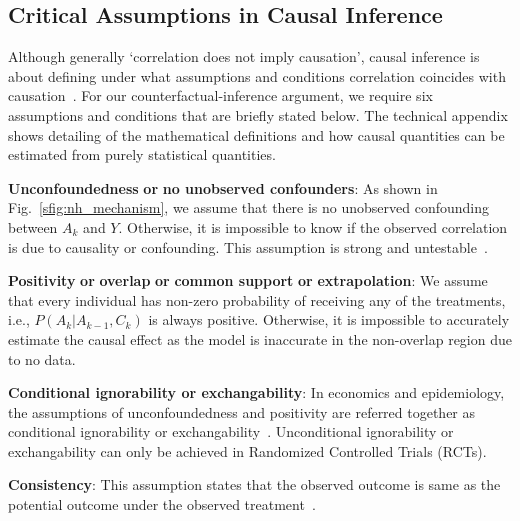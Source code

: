 \documentclass[letterpaper]{article} %
\begin{document}
\subsection{Critical Assumptions in Causal Inference}
Although generally `correlation does not imply causation', causal inference is about defining under what assumptions and conditions correlation coincides with causation~\cite{pearl2009causality, neal2020Intro2CI}. For our counterfactual-inference argument, we require six assumptions and conditions that are briefly stated below. 
The technical appendix shows detailing of the mathematical definitions and how causal quantities can be estimated from purely statistical quantities. 

\begin{inparaenum}[1.]
\item \textbf{Unconfoundedness} \textbf{or} \textbf{no unobserved confounders}: 
As shown in Fig.~\ref{sfig:nh_mechanism}, we assume that there is no unobserved confounding between $A_k$ and $Y$. Otherwise, it is impossible to know if the observed correlation is due to causality or confounding. This assumption is strong and untestable~\cite{Rubin1990unconfoundedness}. 

\item \textbf{Positivity} \textbf{or} \textbf{overlap} \textbf{or} \textbf{common support} \textbf{or} \textbf{extrapolation}: We assume that every individual has non-zero probability of receiving any of the treatments, i.e., $P(A_k|A_{k-1},C_k)$ is always positive. Otherwise, it is impossible to accurately estimate the causal effect as the model is inaccurate in the non-overlap region due to no data.%

\item \textbf{Conditional ignorability or exchangability}: In economics and epidemiology, the assumptions of unconfoundedness and positivity are referred together as conditional ignorability or exchangability~\cite{Rosenbaum1983propensityscoreipw}. Unconditional ignorability or exchangability can only be achieved in Randomized Controlled Trials (RCTs).

\item \textbf{Consistency}: This assumption states that the observed outcome is same as the potential outcome under the observed treatment~\cite{ROBINS1986gcom, cole2009consistency, vanderweele2009concerningconsistency}.


\end{inparaenum}
\end{document}
